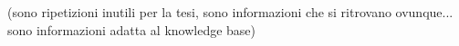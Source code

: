 \documentclass[Main]{subfiles}
\begin{document}
	(sono ripetizioni inutili per la tesi, sono informazioni che si ritrovano ovunque... sono informazioni adatta al knowledge base)
\end{document}
